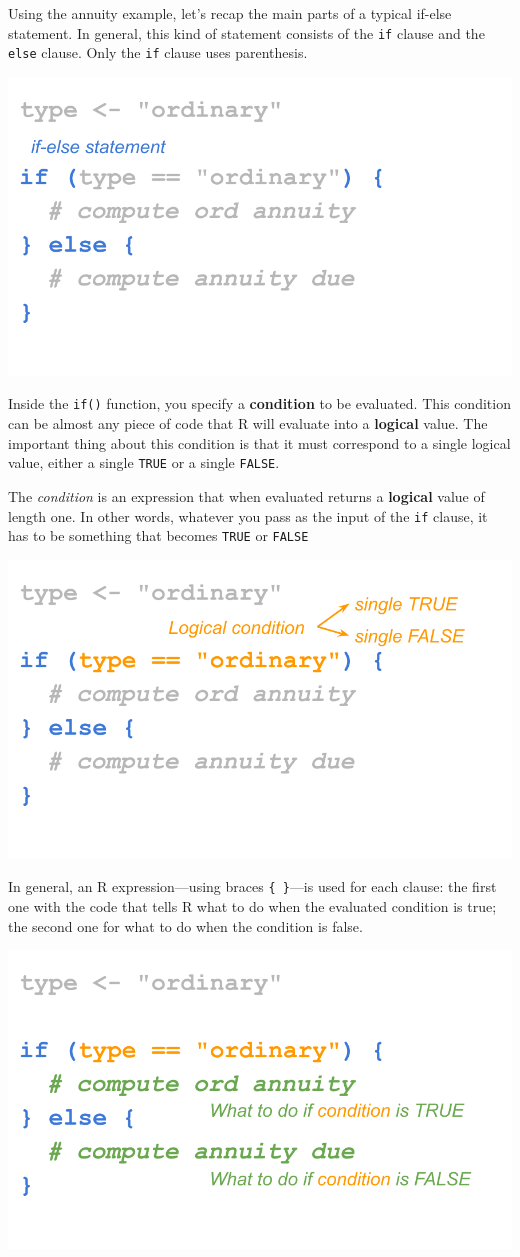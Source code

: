 \documentclass[
]{book}
\begin{document}
Using the annuity example, let's recap the main parts of a typical if-else
statement. In general, this kind of statement consists of the \texttt{if} clause
and the \texttt{else} clause. Only the \texttt{if} clause uses parenthesis.

\begin{center}\includegraphics[width=0.5\linewidth]{images/conditionals/if-else-anatomy-2} \end{center}

Inside the \texttt{if()} function, you specify a \textbf{condition} to be
evaluated. This condition can be almost any piece of code that R will evaluate
into a \textbf{logical} value. The important thing about this condition is that it
must correspond to a single logical value, either a single \texttt{TRUE} or a single
\texttt{FALSE}.

The \emph{condition} is an expression that when evaluated returns
a \textbf{logical} value of length one. In other words, whatever you pass as the
input of the \texttt{if} clause, it has to be something that becomes \texttt{TRUE} or \texttt{FALSE}

\begin{center}\includegraphics[width=0.5\linewidth]{images/conditionals/if-else-anatomy-3} \end{center}

In general, an R expression---using braces \texttt{\{\ \}}---is used for each clause:
the first one with the code that tells R what to do when the evaluated
condition is true; the second one for what to do when the condition is false.

\begin{center}\includegraphics[width=0.5\linewidth]{images/conditionals/if-else-anatomy-6} \end{center}
\end{document}
